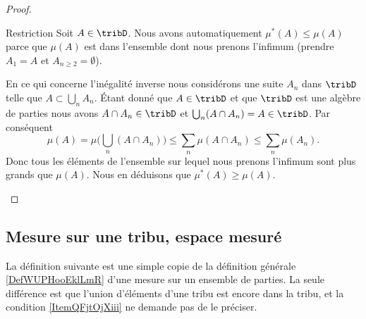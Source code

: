 \begin{proof}
\begin{subproof}
		\item[Restriction]
		Soit \( A\in\tribD\). Nous avons automatiquement \( \mu^*(A)\leq \mu(A)\) parce que \( \mu(A)\) est dans l'ensemble dont nous prenons l'infimum (prendre \( A_1=A\) et \( A_{n\geq 2}=\emptyset\)).

		En ce qui concerne l'inégalité inverse nous considérons une suite \( A_n\) dans \( \tribD\) telle que \( A\subset\bigcup_nA_n\). Étant donné que \( A\in\tribD\) et que \( \tribD\) est une algèbre de parties nous avons \( A\cap A_n\in \tribD\) et \( \bigcup_n(A\cap A_n)=A\in\tribD\). Par conséquent
		\begin{equation}
			\mu(A)=\mu\big( \bigcup_n(A\cap A_n) \big)\leq \sum_n\mu(A\cap A_n)\leq \sum_n\mu(A_n).
		\end{equation}
		Donc tous les éléments de l'ensemble sur lequel nous prenons l'infimum sont plus grands que \( \mu(A)\). Nous en déduisons que \( \mu^*(A)\geq \mu(A)\).
	\end{subproof}
\end{proof}

\subsection{Mesure sur une tribu, espace mesuré}

La définition suivante est une simple copie de la définition générale \ref{DefWUPHooEklLmR} d'une mesure sur un ensemble de parties. La seule différence est que l'union d'éléments d'une tribu est encore dans la tribu, et la condition \ref{ItemQFjtOjXiii} ne demande pas de le préciser.

